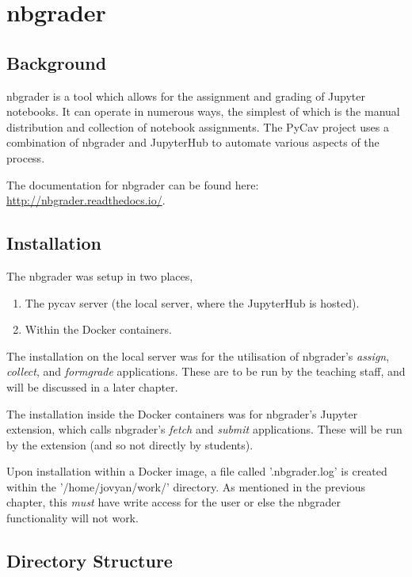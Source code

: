 \section{nbgrader}

   \subsection{Background}
   
   nbgrader is a tool which allows for the assignment and grading of Jupyter notebooks. It can operate in numerous ways, the simplest of which is the manual distribution and collection of notebook assignments. The PyCav project uses a combination of nbgrader and JupyterHub to automate various aspects of the process.
   
   The documentation for nbgrader can be found here: \url{http://nbgrader.readthedocs.io/}.
   
   \subsection{Installation}
   
   The nbgrader was setup in two places,
   
   \begin{enumerate}
       \item The pycav server (the local server, where the JupyterHub is hosted).
       \item Within the Docker containers.
   \end{enumerate}

   The installation on the local server was for the utilisation of nbgrader's \textit{assign}, \textit{collect}, and \textit{formgrade} applications. These are to be run by the teaching staff, and will be discussed in a later chapter.
   
   The installation inside the Docker containers was for nbgrader's Jupyter extension, which calls nbgrader's \textit{fetch} and \textit{submit} applications. These will be run by the extension (and so not directly by students).
   
   Upon installation within a Docker image, a file called '.nbgrader.log' is created within the '/home/jovyan/work/' directory. As mentioned in the previous chapter, this \textit{must} have write access for the user or else the nbgrader functionality will not work.
   
   
   \subsection{Directory Structure}
   
